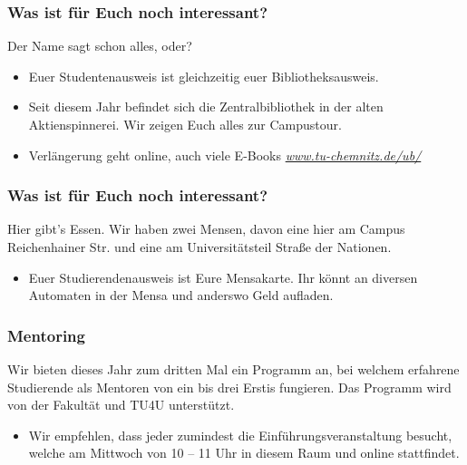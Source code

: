\documentclass[10pt]{beamer}
\begin{document}
\begin{frame}
\frametitle{Was ist für Euch noch interessant?}
\begin{block}{\vphantom{X}}
	Der Name sagt schon alles, oder?
\end{block}
\begin{itemize}
	\item Euer Studentenausweis ist gleichzeitig euer Bibliotheksausweis.
	\item Seit diesem Jahr befindet sich die Zentralbibliothek in der alten Aktienspinnerei. Wir zeigen Euch alles zur Campustour.
	\item Verlängerung geht online, auch viele E-Books \textit{\href{https://www.tu-chemnitz.de/ub/}{www.tu-chemnitz.de/ub/}}
\end{itemize}
\end{frame}

\begin{frame}
\frametitle{Was ist für Euch noch interessant?}
\begin{block}{\vphantom{X}}
	Hier gibt's Essen. Wir haben zwei Mensen, davon eine hier am Campus Reichenhainer Str. und eine am Universitätsteil Straße der Nationen.
\end{block}
\begin{itemize}
	\item Euer Studierendenausweis ist Eure Mensakarte. Ihr könnt an diversen Automaten in der Mensa und anderswo Geld aufladen.
\end{itemize}
\end{frame}

\begin{frame}
\frametitle{Mentoring}
\begin{block}{\vphantom{X}}
	Wir bieten dieses Jahr zum dritten Mal ein Programm an, bei welchem erfahrene Studierende als Mentoren von ein bis drei Erstis fungieren. Das Programm wird von der Fakultät und TU4U unterstützt.
\end{block}
\begin{itemize}
	\item Wir empfehlen, dass jeder zumindest die Einführungsveranstaltung besucht, welche am Mittwoch von 10 -- 11 Uhr in diesem Raum und online stattfindet.
\end{itemize}
\end{frame}
\end{document}
